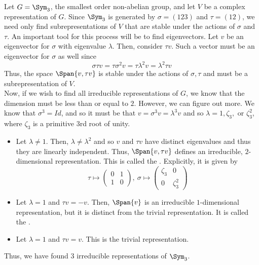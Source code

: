 \documentclass[11pt,leqno,oneside]{amsbook}
\numberwithin{thm}{section}
\begin{document}
\begin{example}
  Let \(G=\Sym_3\), the smallest order non-abelian group, and let
  \(V\) be a complex representation of \(G\). Since \(\Sym_3\) is
  generated by \(\sigma = (123)\) and \(\tau = (12)\), we need only
  find subrepresentations of \(V\) that are stable under the actions
  of \(\sigma\) and \(\tau\). An important tool for this process will
  be to find eigenvectors. Let \(v\) be an eigenvector for
  \(\sigma\) with eigenvalue \(\lambda\). Then, consider \(\tau
  v\). Such a vector must be an 
  eigenvector for \(\sigma\) as well since \[
    \sigma \tau v = \tau \sigma^2 v = \tau \lambda^2 v = \lambda^2
    \tau v
  \]
  Thus, the space \(\Span \{v,\tau v\}\) is stable under the actions of
  \(\sigma,\tau\) and must be a subrepresentation of \(V\). \\

  Now, if we wish to find all irreducible representations of \(G\), we
  know that the dimension must be less than or equal to
  \(2\). However, we can figure out more. We know that \(\sigma^3 =
  Id\), and so it must be that \(v = \sigma^3 v = \lambda^3 v\) and so
  \(\lambda = 1, \zeta_3,\) or \(\zeta_3^2\), where \(\zeta_3\) is a
  primitive \(3\)rd root of unity.
  \begin{itemize}
  \item Let \(\lambda \neq 1\). Then, \(\lambda \neq \lambda^2\) and
    so \(v\) and \(\tau v\) have distinct eigenvalues and thus they
    are linearly independent. Thus, \(\Span\{v,\tau v\}\) defines an
    irreducible, \(2\)-dimensional representation. This is called the
    . Explicitly, it is given by \[
      \tau \mapsto \left(
        \begin{array}{cc}
          0&1\\
          1&0
        \end{array}
\right), \ \sigma \mapsto \left(
  \begin{array}{cc}
    \zeta_3&0\\
    0&\zeta_3^2
  \end{array}
\right)
    \]
  \item Let \(\lambda = 1\) and \(\tau v = -v\). Then, \(\Span\{v\}\)
    is an irreducible \(1\)-dimensional representation, but it is
    distinct from the trivial representation. It is called the
    .
  \item Let \(\lambda = 1\) and \(\tau v = v\). This is the trivial
    representation. 
  \end{itemize}
  Thus, we have found \(3\) irreducible representations of
  \(\Sym_3\).
\end{example}
\end{document}
